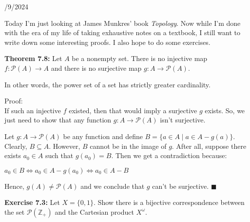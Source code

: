 \documentclass{book}
\newcommand{\hOne}{%
   \color{Black}%
   \fontsize{14}{16}\selectfont%
}
\newcommand{\hTwo}{%
\color{Black}%
   \fontsize{13}{15}\selectfont%
}
\newcommand{\myComment}{%
   \color{RawerSienna}%
   \fontsize{12}{14}\selectfont%
}
\newcommand{\exOne}{%
   \color{Purple}%
   \fontsize{14}{16}\selectfont%
}
\newenvironment{myIndent}{%
   \begin{adjustwidth}{2.5em}{0em}%
}{%
   \end{adjustwidth}%
}
\newenvironment{myDindent}{%
   \begin{adjustwidth}{5em}{0em}%
}{%
   \end{adjustwidth}%
}
\newcommand{\blab}[1]{\textbf{#1}}
\newcommand{\retTwo}{\hfill\bigbreak}
\newcommand{\dispDate}[1]{{
   \color{Black}%
   \fontsize{20}{18}\selectfont%
   #1\retTwo
}}
\begin{document}
   \dispDate{9/9/2024}

   \hOne
   Today I'm just looking at James Munkres' book \textit{Topology}. Now while I'm done with the era of my life of taking exhaustive notes on a textbook, I still want to write down some interesting proofs. I also hope to do some exercises.\retTwo

   \blab{Theorem 7.8:} Let $A$ be a nonempty set. There is no injective map $f: \mathcal{P}(A) \longrightarrow A$ and there is no surjective map $g: A \longrightarrow \mathcal{P}(A)$.

   \begin{myDindent}\myComment
      In other words, the power set of a set has strictly greater cardinality.\retTwo
   \end{myDindent}

   
   \begin{myIndent}\hTwo
      Proof:\\
      If such an injective $f$ existed, then that would imply a surjective $g$ exists. So, we just need to show that any function $g: A \longrightarrow \mathcal{P}(A)$ isn't surjective.\retTwo

      Let $g: A \longrightarrow \mathcal{P}(A)$ be any function and define $B = \{a \in A \mid a \in A - g(a)\}$.\\ Clearly, $B \subseteq A$. However, $B$ cannot be in the image of $g$. After all, suppose there exists $a_0 \in A$ such that $g(a_0) = B$. Then we get a contradiction because:

      {\centering $a_0 \in B \Longleftrightarrow a_0 \in A - g(a_0) \Longleftrightarrow a_0 \in A - B$ \retTwo\par}

      Hence, $g(A) \neq \mathcal{P}(A)$ and we conclude that $g$ can't be surjective. $\blacksquare$\retTwo\retTwo
   \end{myIndent}

   \exOne
   \blab{Exercise 7.3:} Let $X= \{0, 1\}$. Show there is a bijective correspondence between the set $\mathcal{P}(\mathbb{Z}_+)$ and the Cartesian product $X^\omega$.\retTwo
\end{document}
